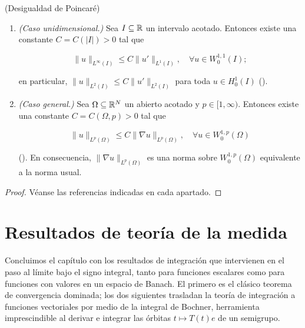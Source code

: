 \begin{Teorema}{(Desigualdad de Poincaré)}
\label{ch:preliminares:th:poincare}

\begin{enumerate}
    \item \emph{(Caso unidimensional.)} Sea $I \subseteq \mathbb{R}$ un intervalo
    acotado. Entonces existe una constante $C = C(|I|) > 0$ tal que

    \[\lVert u \rVert_{L^\infty(I)} \leq C \lVert u' \rVert_{L^1(I)}, \quad \forall u \in W_0^{1,1}(I);\]

    en particular, $\lVert u \rVert_{L^2(I)} \leq C \lVert u' \rVert_{L^2(I)}$
    para toda $u \in H_0^1(I)$ (\cite[Proposición~8.13]{brezis-2011-fun-ana-sob}).

    \item \emph{(Caso general.)} Sea $\Omega \subseteq \mathbb{R}^N$ un abierto acotado y
    $p \in [1, \infty)$. Entonces existe una constante $C = C(\Omega, p) > 0$ tal
    que

    \[\lVert u \rVert_{L^p(\Omega)} \leq C \lVert \nabla u \rVert_{L^p(\Omega)}, \quad \forall u \in W_0^{1,p}(\Omega)\]

    (\cite[Corolario~9.19]{brezis-2011-fun-ana-sob}). En consecuencia,
    $\lVert \nabla u \rVert_{L^p(\Omega)}$ es una norma sobre $W_0^{1,p}(\Omega)$
    equivalente a la norma usual.
\end{enumerate}
\end{Teorema}

\begin{proof}
Véanse las referencias indicadas en cada apartado.
\end{proof}

\section{Resultados de teoría de la medida}
\label{ch:preliminares:section:medida}

Concluimos el capítulo con los resultados de integración que intervienen en el
paso al límite bajo el signo integral, tanto para funciones escalares como para
funciones con valores en un espacio de Banach. El primero es el clásico teorema
de convergencia dominada; los dos siguientes trasladan la teoría de integración a
funciones vectoriales por medio de la integral de Bochner, herramienta
imprescindible al derivar e integrar las órbitas $t \mapsto T(t)e$ de un
semigrupo.

